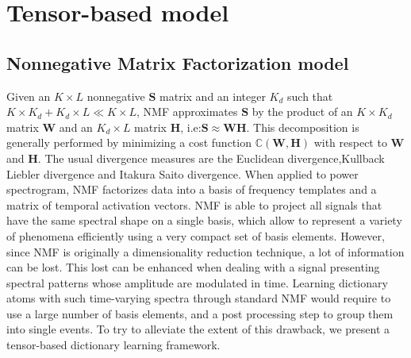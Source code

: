 \documentclass{article}
\def\S{{\mathbf S}}
\def\W{{\mathbf W}}
\def\H{{\mathbf H}}
\begin{document}
\section{Tensor-based model}
\subsection{Nonnegative Matrix Factorization model}
 Given an $K\times L$ nonnegative $\S$ matrix and an integer $K_{d}$ such that   $K\times K_{d}+K_{d}\times L\ll K\times L$, NMF approximates $\S$ by the product of an $K\times K_{d}$ matrix $\W$ and an $K_{d}\times L$ matrix $\H$, i.e:$\S \approx \W\H$. 
 This decomposition is generally performed by minimizing a cost function $\mathbb{C}(\W,\H)$ with respect to $\W$ and $\H$. 
 The usual divergence measures are the Euclidean divergence,Kullback Liebler divergence
and Itakura Saito divergence. When applied to power spectrogram, NMF factorizes data into a basis of frequency templates and a matrix of temporal activation vectors. NMF is able to project all signals that have the same spectral shape on a single basis, which allow to represent a variety of phenomena efficiently using a very compact set of basis elements. However, since NMF is originally a dimensionality reduction technique, a lot of information can be lost. This lost can be enhanced when dealing with a signal presenting spectral patterns whose amplitude
are modulated in time. Learning dictionary atoms with such time-varying spectra through
standard NMF would require to use a large number of basis elements, and a post processing step to group them into single events.
To try to alleviate the extent of this drawback, we present a tensor-based dictionary learning framework.
\end{document}
